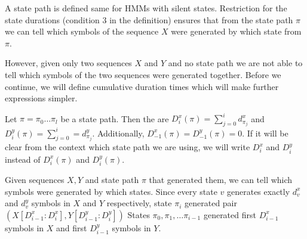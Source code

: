 A state path is defined same for HMMs with silent states. Restriction for the
state durations (condition $3$ in the definition) ensures
that from the state path $\pi$ we can tell which symbols of the sequence $X$
were generated by which state from $\pi$.

However, given only two sequences $X$ and $Y$ and no state path we are not able
to tell which symbols of the two sequences were generated together. Before we
continue, we will define cumulative duration times which will make further
expressions simpler.

\begin{definition}
Let $\pi=\pi_0\dots\pi_l$ be a state path. Then the  are
$D^x_i(\pi)=\sum_{j=0}^{i}d^x_{\pi_j}$ and $D^y_i(\pi)=\sum_{j=0}^{i}=d^y_{\pi_j}$.
Additionally, $D^x_{-1}(\pi)=D^y_{-1}(\pi)=0$. If it will be clear from the context
which state path we are using, we will write $D^x_i$ and $D^y_i$ instead of
$D^x_i(\pi)$ and $D^y_i(\pi)$.
\end{definition}

Given sequences $X,Y$ and state path $\pi$ that generated them, we 
can tell which symbols were generated by which states. Since every state $v$
generates exactly $d^x_v$ and $d^y_v$ symbols in $X$ and $Y$ respectively,
state $\pi_i$ generated pair $(X[D^x_{i-1}:D^x_{i}],Y[D^y_{i-1}:D^y_{i}])$
States $\pi_0,\pi_1,\dots\pi_{i-1}$ generated first $D^x_{i-1}$ symbols in $X$
and first $D^y_{i-1}$ symbols in $Y$. 


